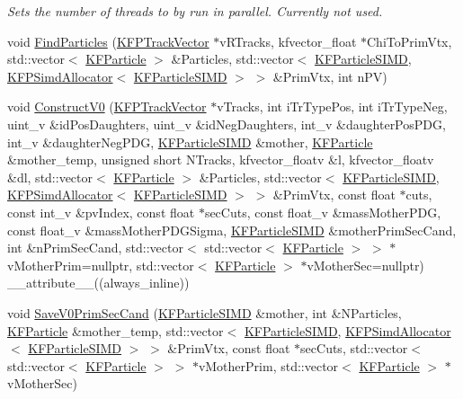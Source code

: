 \begin{DoxyCompactItemize}
\begin{DoxyCompactList}\small\item\em Sets the number of threads to by run in parallel. Currently not used. \end{DoxyCompactList}\item 
void \hyperlink{classKFParticleFinder_a3ad831d1b28cce4689501e369f561926}{Find\+Particles} (\hyperlink{classKFPTrackVector}{K\+F\+P\+Track\+Vector} $\ast$v\+R\+Tracks, kfvector\+\_\+float $\ast$Chi\+To\+Prim\+Vtx, std\+::vector$<$ \hyperlink{classKFParticle}{K\+F\+Particle} $>$ \&Particles, std\+::vector$<$ \hyperlink{classKFParticleSIMD}{K\+F\+Particle\+S\+I\+MD}, \hyperlink{classKFPSimdAllocator}{K\+F\+P\+Simd\+Allocator}$<$ \hyperlink{classKFParticleSIMD}{K\+F\+Particle\+S\+I\+MD} $>$ $>$ \&Prim\+Vtx, int n\+PV)
\item 
void \hyperlink{classKFParticleFinder_a2346e637d92eae212091abd37919403e}{Construct\+V0} (\hyperlink{classKFPTrackVector}{K\+F\+P\+Track\+Vector} $\ast$v\+Tracks, int i\+Tr\+Type\+Pos, int i\+Tr\+Type\+Neg, uint\+\_\+v \&id\+Pos\+Daughters, uint\+\_\+v \&id\+Neg\+Daughters, int\+\_\+v \&daughter\+Pos\+P\+DG, int\+\_\+v \&daughter\+Neg\+P\+DG, \hyperlink{classKFParticleSIMD}{K\+F\+Particle\+S\+I\+MD} \&mother, \hyperlink{classKFParticle}{K\+F\+Particle} \&mother\+\_\+temp, unsigned short N\+Tracks, kfvector\+\_\+floatv \&l, kfvector\+\_\+floatv \&dl, std\+::vector$<$ \hyperlink{classKFParticle}{K\+F\+Particle} $>$ \&Particles, std\+::vector$<$ \hyperlink{classKFParticleSIMD}{K\+F\+Particle\+S\+I\+MD}, \hyperlink{classKFPSimdAllocator}{K\+F\+P\+Simd\+Allocator}$<$ \hyperlink{classKFParticleSIMD}{K\+F\+Particle\+S\+I\+MD} $>$ $>$ \&Prim\+Vtx, const float $\ast$cuts, const int\+\_\+v \&pv\+Index, const float $\ast$sec\+Cuts, const float\+\_\+v \&mass\+Mother\+P\+DG, const float\+\_\+v \&mass\+Mother\+P\+D\+G\+Sigma, \hyperlink{classKFParticleSIMD}{K\+F\+Particle\+S\+I\+MD} \&mother\+Prim\+Sec\+Cand, int \&n\+Prim\+Sec\+Cand, std\+::vector$<$ std\+::vector$<$ \hyperlink{classKFParticle}{K\+F\+Particle} $>$ $>$ $\ast$v\+Mother\+Prim=nullptr, std\+::vector$<$ \hyperlink{classKFParticle}{K\+F\+Particle} $>$ $\ast$v\+Mother\+Sec=nullptr) \+\_\+\+\_\+attribute\+\_\+\+\_\+((always\+\_\+inline))
\item 
void \hyperlink{classKFParticleFinder_ad5a61416f528be9d0b397352f7619953}{Save\+V0\+Prim\+Sec\+Cand} (\hyperlink{classKFParticleSIMD}{K\+F\+Particle\+S\+I\+MD} \&mother, int \&N\+Particles, \hyperlink{classKFParticle}{K\+F\+Particle} \&mother\+\_\+temp, std\+::vector$<$ \hyperlink{classKFParticleSIMD}{K\+F\+Particle\+S\+I\+MD}, \hyperlink{classKFPSimdAllocator}{K\+F\+P\+Simd\+Allocator}$<$ \hyperlink{classKFParticleSIMD}{K\+F\+Particle\+S\+I\+MD} $>$ $>$ \&Prim\+Vtx, const float $\ast$sec\+Cuts, std\+::vector$<$ std\+::vector$<$ \hyperlink{classKFParticle}{K\+F\+Particle} $>$ $>$ $\ast$v\+Mother\+Prim, std\+::vector$<$ \hyperlink{classKFParticle}{K\+F\+Particle} $>$ $\ast$v\+Mother\+Sec)

\end{DoxyCompactItemize}
